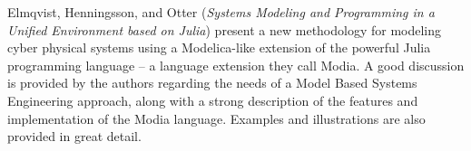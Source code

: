 


Elmqvist, Henningsson, and Otter
\cite{isola-2016-elmqvist}
({\em Systems Modeling and Programming in a
Unified Environment based on Julia})
present a new methodology for modeling cyber physical systems using a Modelica-like extension of the powerful Julia programming language -- a language extension they call Modia. A good discussion is provided by the authors regarding the needs of a Model Based Systems Engineering approach, along with a strong description of the features and implementation of the Modia language. Examples and illustrations are also provided in great detail.

